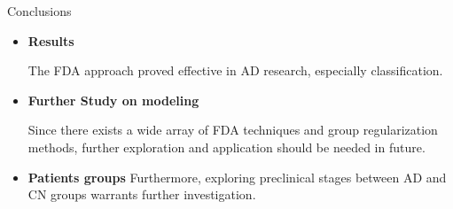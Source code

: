 \documentclass[final]{beamer}
\newlength{\colwidth}
\begin{document}
\begin{frame}[t]
\begin{columns}[t]
\begin{column}{\colwidth}
   \begin{block}{Conclusions}
    \begin{itemize}
      \item \textbf{Results}
      
      The FDA approach proved effective in AD research, especially classification.

      \item \textbf{Further Study on modeling}
      
      Since there exists a wide array of FDA techniques and group regularization methods, further exploration and application should be needed in future.
      
      \item \textbf{Patients groups}
      Furthermore, exploring preclinical stages between AD and CN groups warrants further investigation.
    \end{itemize}
  \end{block}





  


\end{column}
\end{columns}
\end{frame}
\end{document}
